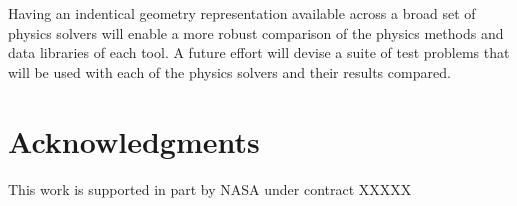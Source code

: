 \documentclass{anstrans}
\begin{document}

Having an indentical geometry representation available across a broad
set of physics solvers will enable a more robust comparison of the
physics methods and data libraries of each tool.  A future effort will
devise a suite of test problems that will be used with each of the
physics solvers and their results compared.

\section{Acknowledgments}
This work is supported in part by NASA under contract XXXXX



\end{document}
